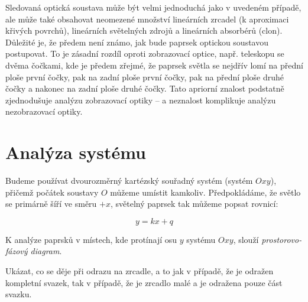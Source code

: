 

Sledovaná optická soustava může být velmi jednoduchá jako v uvedeném případě, ale může také obsahovat neomezené množství lineárních zrcadel (k aproximaci křivých povrchů), lineárních světelných zdrojů a
lineárních absorbérů (clon). Důležité je, že předem není známo, jak bude paprsek optickou soustavou postupovat. To je zásadní rozdíl oproti zobrazovací optice, např. teleskopu se dvěma čočkami, kde je předem zřejmé, že paprsek světla se nejdřív lomí na přední ploše první čočky, pak na zadní ploše první čočky, pak na přední ploše druhé čočky a nakonec na zadní ploše druhé čočky. Tato apriorní znalost podstatně zjednodušuje analýzu zobrazovací optiky -- a neznalost komplikuje analýzu nezobrazovací optiky.



\section{Analýza systému}

Budeme používat dvourozměrný kartézský souřadný systém (systém $Oxy$), 
přičemž počátek soustavy $O$ můžeme umístit kamkoliv. Předpokládáme, že světlo
se primárně šíří ve směru $+x$, světelný paprsek tak můžeme
popsat rovnicí: 

$$y = kx + q$$

K analýze paprsků v místech, kde protínají osu $y$ systému $Oxy$,
slouží \emph{prostorovo-fázový diagram}. 





Ukázat, co se děje při odrazu na zrcadle, a to jak v případě, že je
odražen kompletní svazek, tak v případě, že je zrcadlo malé a je
odražena pouze část svazku.

